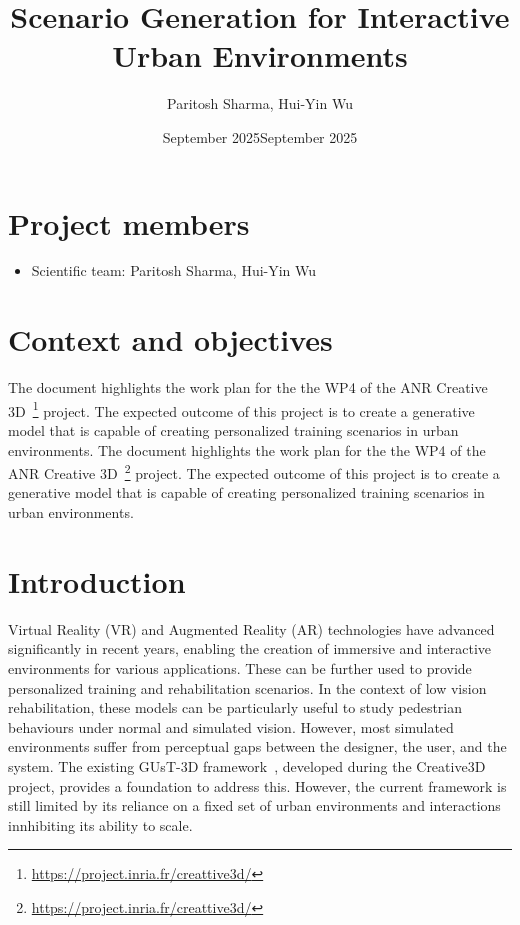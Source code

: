 \documentclass{article}
\title{Scenario Generation for Interactive Urban Environments}
\author{Paritosh Sharma, Hui-Yin Wu}
\date{September 2025}
\date{September 2025}
\begin{document}
\maketitle

\section*{Project members}

\begin{itemize}
    \item Scientific team: Paritosh Sharma, Hui-Yin Wu
\end{itemize}

\section{Context and objectives}

The document highlights the work plan for the the WP4 of the ANR Creative 3D~\footnote{\url{https://project.inria.fr/creattive3d/}} project. The expected outcome of this project is to create a generative model that is capable of creating personalized training scenarios in urban environments.
The document highlights the work plan for the the WP4 of the ANR Creative 3D~\footnote{\url{https://project.inria.fr/creattive3d/}} project. The expected outcome of this project is to create a generative model that is capable of creating personalized training scenarios in urban environments.

\section{Introduction}

Virtual Reality (VR) and Augmented Reality (AR) technologies have advanced significantly in recent years, enabling the creation of immersive and interactive environments for various applications. These can be further used to provide personalized training and rehabilitation scenarios. In the context of low vision rehabilitation, these models can be particularly useful to study pedestrian behaviours under normal and simulated vision. However, most simulated environments suffer from perceptual gaps between the designer, the user, and the system. The existing GUsT-3D framework~\cite{wu2022designing}, developed during the Creative3D project, provides a foundation to address this. However, the current framework is still limited by its reliance on a fixed set of urban environments and interactions innhibiting its ability to scale.
\end{document}
